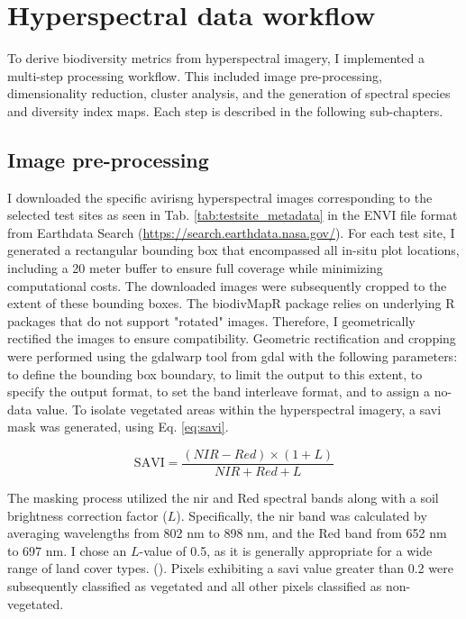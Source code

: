 \section{Hyperspectral data workflow}
To derive biodiversity metrics from hyperspectral imagery, I implemented a multi-step processing workflow. This included image pre-processing, dimensionality reduction, cluster analysis, and the generation of spectral species and diversity index maps. Each step is described in the following sub-chapters.

\subsection{Image pre-processing}
I downloaded the specific \ac{avirisng} hyperspectral images corresponding to the selected test sites as seen in Tab. \ref{tab:testsite_metadata} in the ENVI file format from Earthdata Search ({\small\url{https://search.earthdata.nasa.gov/}}). For each test site, I generated a rectangular bounding box that encompassed all in-situ plot locations, including a 20 meter buffer to ensure full coverage while minimizing computational costs. The downloaded images were subsequently cropped to the extent of these bounding boxes. The biodivMapR package relies on underlying R packages that do not support "rotated" images. Therefore, I geometrically rectified the images to ensure compatibility. Geometric rectification and cropping were performed using the gdalwarp tool from \ac{gdal} with the following parameters:  to define the bounding box boundary,  to limit the output to this extent,  to specify the output format,  to set the band interleave format, and   to assign a no-data value. To isolate vegetated areas within the hyperspectral imagery, a \ac{savi}  mask was generated, using Eq. \ref{eq:savi}.

\begin{equation}
\text{SAVI} = \frac{(NIR - Red) \times (1 + L)}{NIR + Red + L}
\label{eq:savi}
\end{equation}

The masking process utilized the \ac{nir} and Red spectral bands along with a soil brightness correction factor ($L$). Specifically, the \ac{nir} band was calculated by averaging wavelengths from 802 nm to 898 nm, and the Red band from 652 nm to 697 nm. I chose an $L$-value of 0.5, as it is generally appropriate for a wide range of land cover types. (\cite{noauthor_landsat_nodate}). Pixels exhibiting a \ac{savi} value greater than 0.2 were subsequently classified as vegetated and all other pixels classified as non-vegetated.

